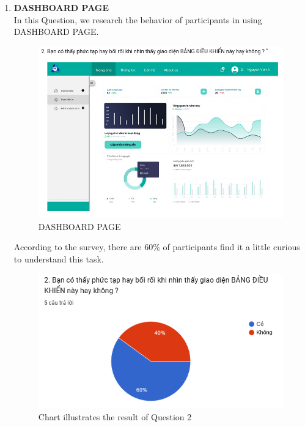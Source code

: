 \begin{enumerate}
    \item \textbf{DASHBOARD PAGE} \\
    In this Question, we research the behavior of participants in using DASHBOARD PAGE.
\begin{figure}[!h]
    \centering
    \includegraphics[width=0.8\linewidth]{images/image_uasbility/Q2_SPSO.png}
    \caption{DASHBOARD PAGE}
    \label{fig:DASHBOARD}
\end{figure}
\newpage
According to the survey, there are 60\% of participants find it a little curious to understand this task.
\begin{figure}[!h]
    \centering
    \includegraphics[width=0.8\linewidth]{images/image_uasbility/A2_SPSO.png}
    \caption{Chart illustrates the result of Question 2}
    \label{fig:Chart illustrates the result of Question 2}
\end{figure}



\end{enumerate}
